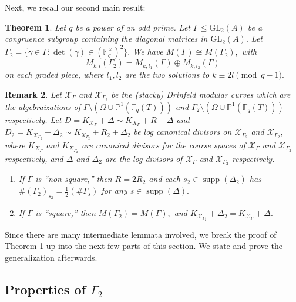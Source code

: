 \documentclass[11pt]{amsart}
\newtheorem{theorem}{Theorem}[section]
\newtheorem{remark}[theorem]{Remark}
\theoremstyle{definition}
\numberwithin{equation}{section}
\newcommand{\GL}{\mathrm{GL}} 	%
\newcommand{\sX}{\mathscr{X}}		%
\newcommand{\bbF}{\mathbb{F}}		%
\newcommand{\bbP}{\mathbb{P}}		%
\begin{document}
		Next, we recall our second main result:
		\begin{theorem}
		\label{thm: decomp of mod forms}
			Let $q$ be a power of an odd prime. Let $\Gamma\leq \GL_2(A)$ be a congruence subgroup containing the diagonal matrices in $\GL_2(A).$ Let $\Gamma_2=\{\gamma\in \Gamma: \det(\gamma)\in (\bbF_q^{\times})^2\}.$ We have
			$M(\Gamma)\cong M(\Gamma_2),$
			with \[M_{k,l}(\Gamma_2)=M_{k,l_1}(\Gamma)\oplus M_{k,l_2}(\Gamma)\] on each graded piece, where $l_1,l_2$ are the two solutions to $k\equiv 2l\pmod{q-1}.$ 
		\end{theorem}
		
		\begin{remark}
			 Let $\sX_{\Gamma}$ and $\sX_{\Gamma_2}$ be the (stacky) Drinfeld modular curves which are the algebraizations of $\Gamma\setminus(\Omega\cup \bbP^1(\bbF_q(T)))$ and $\Gamma_2\setminus(\Omega\cup \bbP^1(\bbF_q(T)))$ respectively.
			Let $\displaystyle{D=K_{\sX_{\Gamma}}+\Delta\sim K_{X_{\Gamma}}+R+\Delta}$ and $\displaystyle{D_2=K_{\sX_{\Gamma_2}}+\Delta_2\sim K_{X_{\Gamma_2}}+R_2+\Delta_2}$ be log canonical divisors on $\sX_{\Gamma_2}$ and $\sX_{\Gamma_2},$ where
			$K_{X_{\Gamma}}$ and $K_{X_{\Gamma_2}}$ are canonical divisors for the coarse spaces of $\sX_{\Gamma}$ and $\sX_{\Gamma_2}$ respectively, and $\Delta$ and $\Delta_2$ are the log divisors of $\sX_{\Gamma}$ and $\sX_{\Gamma_2}$ respectively.
			\begin{enumerate}
				\item If $\Gamma$ is ``non-square,'' then
				$R=2R_2$ and each $s_2\in \operatorname{supp}(\Delta_2)$ has $\#(\Gamma_2)_{s_2}=\frac{1}{2}(\#\Gamma_s)$ for any $s\in \operatorname{supp}(\Delta).$
				
				\item If $\Gamma$ is ``square,'' then $M(\Gamma_2)=M(\Gamma),$ and $K_{\sX_{\Gamma_2}}+\Delta_2=K_{\sX_{\Gamma}}+\Delta.$ 
			\end{enumerate}
		\end{remark}
		
		Since there are many intermediate lemmata involved, we break the proof of Theorem \ref{thm: decomp of mod forms} up into the next few parts of this section. We state and prove the generalization afterwards.
		
		\subsection{Properties of $\Gamma_2$}
		
\end{document}
